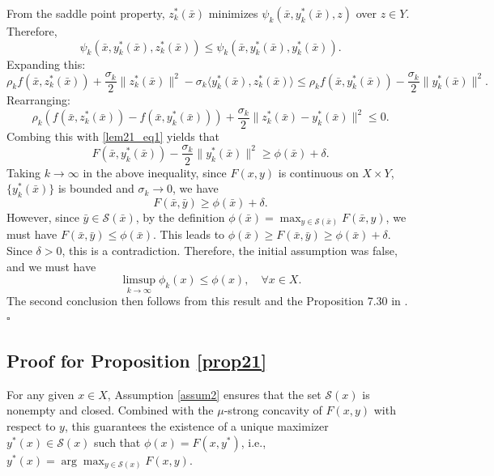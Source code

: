 \documentclass{article}
\newenvironment{proof}[1][Proof]{\par
	\normalfont\topsep6pt\relax
	\trivlist\item[\hskip\labelsep\itshape #1.]\ignorespaces
}{%
	\hfill\ensuremath{\square}\endtrivlist
}
\begin{document}
\begin{proof}[proof of Lemma \ref{lem21}]
From the saddle point property, $z_k^*(\bar{x})$ minimizes $\psi_{k}(\bar{x}, y_k^*(\bar{x}), z)$ over $z \in Y$. Therefore,
    \[
    \psi_k (\bar{x},y_k^*(\bar{x}), z_k^*(\bar{x})) \le \psi_k (\bar{x},y_k^*(\bar{x}), y_k^*(\bar{x})).
    \]
Expanding this:
\[
 \rho_k f(\bar{x}, z_k^*(\bar{x}) ) + \frac{\sigma_k}{2}\| z_k^*(\bar{x}) \|^2 - \sigma_k \langle y_k^*(\bar{x}) , z_k^*(\bar{x}) \rangle\le  \rho_k f(\bar{x}, y_k^*(\bar{x})  ) - \frac{\sigma_k}{2}\| y_k^*(\bar{x}) \|^2.
    \]
Rearranging:  
\[
    \rho_k \left( f(\bar{x}, z_k^*(\bar{x}) )  - f(\bar{x}, y_k^*(\bar{x})  )  \right) + \frac{\sigma_k}{2}\|z_k^*(\bar{x}) - y_k^*(\bar{x})\|^2 \le 0.
\]
    Combing this with \eqref{lem21_eq1} yields that
    \[
    F(\bar{x}, y_k^*(\bar{x}) ) - \frac{\sigma_k}{2}\| y_k^*(\bar{x}) \|^2  \ge \phi(\bar{x}) + \delta.
    \]
    Taking $k \rightarrow \infty$ in the above inequality, since $F(x,y)$ is continuous on $X \times Y$, $\{y_k^*(\bar{x})\}$ is bounded and $\sigma_k \rightarrow 0$, we have
    \[
     F(\bar{x}, \bar{y}) \ge \phi(\bar{x}) + \delta.
    \]
    However, since $\bar{y} \in \mathcal{S}(\bar{x})$, by the definition $\phi(\bar{x}) = \max_{y \in \mathcal{S}(\bar{x})} F(\bar{x}, y) $, we must have $F(\bar{x}, \bar{y}) \le \phi(\bar{x})$. This leads to $\phi(\bar{x}) \ge F(\bar{x}, \bar{y}) \ge \phi(\bar{x}) + \delta$. Since $\delta >0$, this is a contradiction. Therefore, the initial assumption was false, and we must have
         \begin{equation*}
         	 	\limsup\limits_{k\to\infty} \phi_{k}({x}) \le \phi({x}), \quad \forall x \in X.
     \end{equation*}
     The second conclusion then follows from this result and the Proposition 7.30 in \cite{rockafellar2009variational}.	
	 \end{proof}


\subsection{Proof for Proposition \ref{prop21}}

For any given $x \in X$, Assumption \ref{assum2} ensures that the set $\mathcal{S}(x)$ is nonempty and closed. Combined with the $\mu$-strong concavity of $F(x,y)$ with respect to $y$, this guarantees the existence of a unique maximizer $y^*(x) \in \mathcal{S}(x)$ such that $\phi(x) = F(x, y^*)$, i.e., $y^*(x) = \arg\max_{y \in \mathcal{S}(x)}F(x,y)$.
\end{document}
